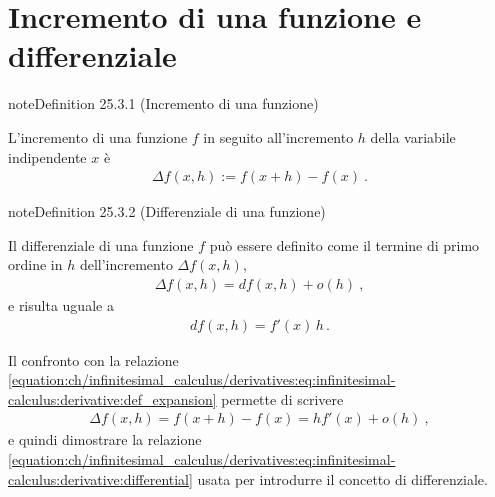 \documentclass[letterpaper,10pt,italian]{jupyterBook}
\begin{document}
\section{Incremento di una funzione e differenziale}
\label{\detokenize{ch/infinitesimal_calculus/derivatives:incremento-di-una-funzione-e-differenziale}}\label{\detokenize{ch/infinitesimal_calculus/derivatives:infinitesimal-calculus-derivatives-differential}}\label{ch/infinitesimal_calculus/derivatives:derivatives-increment}
\begin{sphinxadmonition}{note}{Definition 25.3.1 (Incremento di una funzione)}



\sphinxAtStartPar
L’incremento di una funzione \(f\) in seguito all’incremento \(h\) della variabile indipendente \(x\) è
\begin{equation*}
\begin{split}\Delta f (x, h) := f(x+h) - f(x) \ .\end{split}
\end{equation*}\end{sphinxadmonition}
\label{ch/infinitesimal_calculus/derivatives:derivatives-differential}
\begin{sphinxadmonition}{note}{Definition 25.3.2 (Differenziale di una funzione)}



\sphinxAtStartPar
Il differenziale di una funzione \(f\) può essere definito come il termine di primo ordine in \(h\) dell’incremento \(\Delta f(x,h)\),
\begin{equation*}
\begin{split}\Delta f(x,h) = d f(x,h) + o(h) \ ,\end{split}
\end{equation*}
\sphinxAtStartPar
e risulta uguale a
\begin{equation}\label{equation:ch/infinitesimal_calculus/derivatives:eq:infinitesimal-calculus:derivative:differential}
\begin{split}d f(x, h) = f'(x) \, h \, .\end{split}
\end{equation}\end{sphinxadmonition}

\sphinxAtStartPar
Il confronto con la relazione \eqref{equation:ch/infinitesimal_calculus/derivatives:eq:infinitesimal-calculus:derivative:def_expansion} permette di scrivere
\begin{equation*}
\begin{split}\Delta f(x,h) = f(x+h) - f(x) = h f'(x) + o(h) \ ,\end{split}
\end{equation*}
\sphinxAtStartPar
e quindi dimostrare la relazione \eqref{equation:ch/infinitesimal_calculus/derivatives:eq:infinitesimal-calculus:derivative:differential} usata per introdurre il concetto di differenziale.
\end{document}
